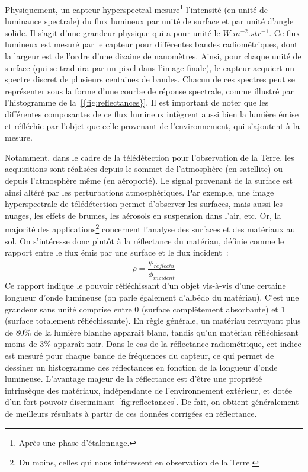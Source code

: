 Physiquement, un capteur hyperspectral mesure\footnote{Après une phase d'étalonnage.} l'intensité (en unité de luminance spectrale) du flux lumineux par unité de surface et par unité d'angle solide. Il s'agit d'une grandeur physique qui a pour unité le $W.m^{-2}.str^{-1}$. Ce flux lumineux est mesuré par le capteur pour différentes bandes radiométriques, dont la largeur est de l'ordre d'une dizaine de nanomètres. Ainsi, pour chaque unité de surface (qui se traduira par un pixel dans l'image finale), le capteur acquiert un spectre discret de plusieurs centaines de bandes. Chacun de ces spectres peut se représenter sous la forme d'une courbe de réponse spectrale, comme illustré par l'histogramme de la~\cref{{fig:reflectances}}. Il est important de noter que les différentes composantes de ce flux lumineux intègrent aussi bien la lumière émise et réfléchie par l'objet que celle provenant de l'environnement, qui s'ajoutent à la mesure.

Notamment, dans le cadre de la télédétection pour l'observation de la Terre, les acquisitions sont réalisées depuis le sommet de l'atmosphère (en satellite) ou depuis l'atmosphère même (en aéroporté). Le signal provenant de la surface est ainsi altéré par les perturbations atmosphériques. Par exemple, une image hyperspectrale de télédétection permet d'observer les surfaces, mais aussi les nuages, les effets de brumes, les aérosols en suspension dans l'air, etc. Or, la majorité des applications\footnote{Du moins, celles qui nous intéressent en observation de la Terre.} concernent l'analyse des surfaces et des matériaux au sol. On s'intéresse donc plutôt à la réflectance du matériau, définie comme le rapport entre le flux émis par une surface et le flux incident~:
$$\rho = \frac{\phi_{r\acute{e}fl\acute{e}chi}}{\phi_{incident}}$$
Ce rapport indique le pouvoir réfléchissant d'un objet vis-à-vis d'une certaine longueur d'onde lumineuse (on parle également d'albédo du matériau). C'est une grandeur sans unité comprise entre 0 (surface complètement absorbante) et 1 (surface totalement réfléchissante). En règle générale, un matériau renvoyant plus de 80\% de la lumière blanche apparaît blanc, tandis qu'un matériau réfléchissant moins de 3\% apparaît noir. Dans le cas de la réflectance radiométrique, cet indice est mesuré pour chaque bande de fréquences du capteur, ce qui permet de dessiner un histogramme des réflectances en fonction de la longueur d'onde lumineuse. L'avantage majeur de la réflectance est d'être une propriété intrinsèque des matériaux, indépendante de l'environnement extérieur, et dotée d'un fort pouvoir discriminant~\cref{fig:reflectances}. De fait, on obtient généralement de meilleurs résultats à partir de ces données corrigées en réflectance.

